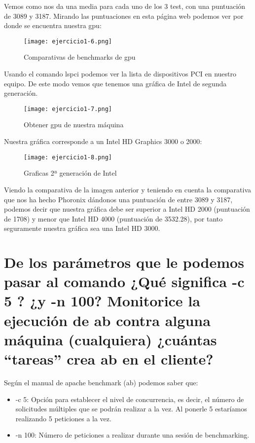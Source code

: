     Vemos como nos da una media para cada uno de los 3 test, con una puntuación de 3089 y 3187. Mirando las puntuaciones en esta página web\cite{ejercicio1-2} podemos ver por donde se encuentra nuestra gpu:
    
    \begin{figure}[H] 
    	\centering
    	\texttt{[image: ejercicio1-6.png]} 
    	\label{figura6} 
    	\caption{Comparativas de benchmarks de gpu}
    \end{figure}
    
    Usando el comando lspci\cite{ejercicio1-3} podemos ver la lista de dispositivos PCI en nuestro equipo. De este modo vemos que tenemos una gráfica de Intel de segunda generación.
    
    
    \begin{figure}[H] 
    	\centering
    	\texttt{[image: ejercicio1-7.png]} 
    	\label{figura7} 
    	\caption{Obtener gpu de nuestra máquina}
    \end{figure}
    
    Nuestra gráfica corresponde a un Intel HD Graphics 3000 o 2000\cite{ejercicio1-4}:
    \begin{figure}[H] 
     	\centering
     	\texttt{[image: ejercicio1-8.png]} 
     	\label{figura8} 
     	\caption{Graficas 2ª generación de Intel}
     \end{figure}
     
     Viendo la comparativa de la imagen anterior y teniendo en cuenta la comparativa que nos ha hecho Phoronix dándonos una puntuación de entre 3089 y 3187, podemos decir que nuestra gráfica debe ser superior a Intel HD 2000 (puntuación de 1708) y menor que Intel HD 4000 (puntuación de 3532.28), por tanto seguramente nuestra gráfica sea una Intel HD 3000.
	
	\section{De los parámetros que le podemos pasar al comando ¿Qué significa -c 5 ? ¿y -n 100? Monitorice la ejecución de ab contra alguna máquina (cualquiera) ¿cuántas “tareas” crea ab en el cliente?}
	
	Según el manual de apache benchmark (ab)\cite{ejercicio2-1} podemos saber que:
	\begin{itemize}
		\item -c 5: Opción para establecer el nivel de concurrencia, es decir, el número de solicitudes múltiples que se podrán realizar a la vez. Al ponerle 5 estaríamos realizando 5 peticiones a la vez.
		\item -n 100: Número de peticiones a realizar durante una sesión de benchmarking.
	\end{itemize}
	

